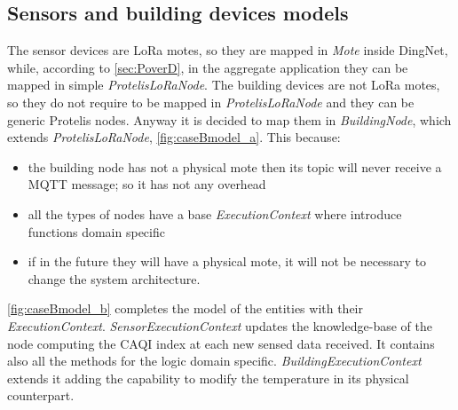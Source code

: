 \subsection*{Sensors and building devices models}
The sensor devices are LoRa motes, so they are mapped in \mbox{\textit{Mote}} inside DingNet, while, according to \cref{sec:PoverD}, in the aggregate application they can be mapped in simple \mbox{\textit{ProtelisLoRaNode}}.
The building devices are not LoRa motes, so they do not require to be mapped in \mbox{\textit{ProtelisLoRaNode}} and they can be generic Protelis nodes.
Anyway it is decided to map them in \mbox{\textit{BuildingNode}}, which extends \mbox{\textit{ProtelisLoRaNode}}, \autoref{fig:caseBmodel_a}. This because:
\begin{itemize}
    \item the building node has not a physical mote then its topic will never receive a MQTT message; so it has not any overhead
    \item all the types of nodes have a base \mbox{\textit{ExecutionContext}} where introduce functions domain specific
    \item if in the future they will have a physical mote, it will not be necessary to change the system architecture.
\end{itemize}
\autoref{fig:caseBmodel_b} completes the model of the entities with their \mbox{\textit{ExecutionContext}}.
\mbox{\textit{SensorExecutionContext}} updates the knowledge-base of the node computing the CAQI index at each new sensed data received. It contains also all the methods for the logic domain specific. \mbox{\textit{BuildingExecutionContext}} extends it adding the capability to modify the temperature in its physical counterpart.
